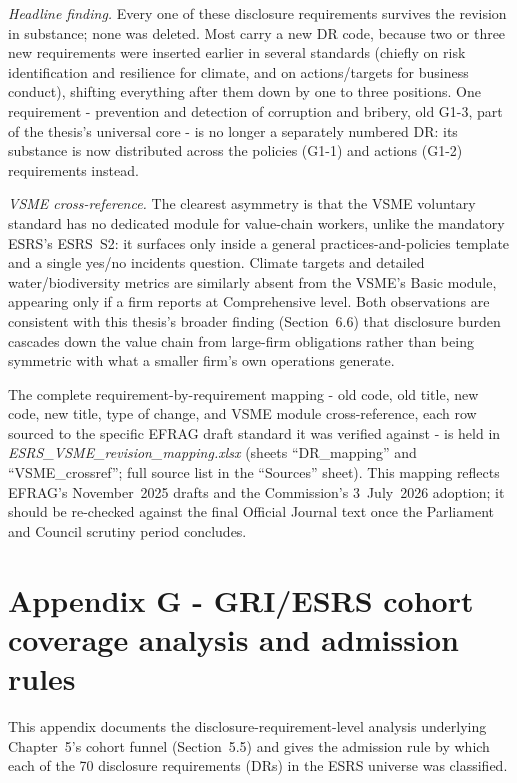 \documentclass[
]{article}
\newcounter{none} %
\begin{document}
\emph{Headline finding.} Every one of these disclosure requirements survives
the revision in substance; none was deleted. Most carry a new DR code,
because two or three new requirements were inserted earlier in several
standards (chiefly on risk identification and resilience for climate, and on
actions/targets for business conduct), shifting everything after them down
by one to three positions. One requirement - prevention and detection of
corruption and bribery, old G1-3, part of the thesis's universal core - is no longer a separately numbered DR: its substance is now distributed
across the policies (G1-1) and actions (G1-2) requirements instead.

\emph{VSME cross-reference.} The clearest asymmetry is that the VSME
voluntary standard has no dedicated module for value-chain workers,
unlike the mandatory ESRS's ESRS~S2: it surfaces only inside a general
practices-and-policies template and a single yes/no incidents question.
Climate targets and detailed water/biodiversity metrics are similarly
absent from the VSME's Basic module, appearing only if a firm reports at
Comprehensive level. Both observations are consistent with this thesis's
broader finding (Section~6.6) that disclosure burden cascades down the
value chain from large-firm obligations rather than being symmetric with
what a smaller firm's own operations generate.

The complete requirement-by-requirement mapping - old code, old title, new
code, new title, type of change, and VSME module cross-reference, each row
sourced to the specific EFRAG draft standard it was verified against - is
held in \emph{ESRS\_VSME\_revision\_mapping.xlsx} (sheets ``DR\_mapping'' and
``VSME\_crossref''; full source list in the ``Sources'' sheet). This mapping
reflects EFRAG's November~2025 drafts and the Commission's 3~July~2026
adoption; it should be re-checked against the final Official Journal text
once the Parliament and Council scrutiny period concludes.

\section*{Appendix G - GRI/ESRS cohort coverage analysis and admission rules}\label{app:gri-esrs-coverage}

This appendix documents the disclosure-requirement-level analysis underlying
Chapter~5's cohort funnel (Section~5.5) and gives the admission
rule by which each of the 70 disclosure requirements (DRs) in the ESRS
universe was classified.
\end{document}
